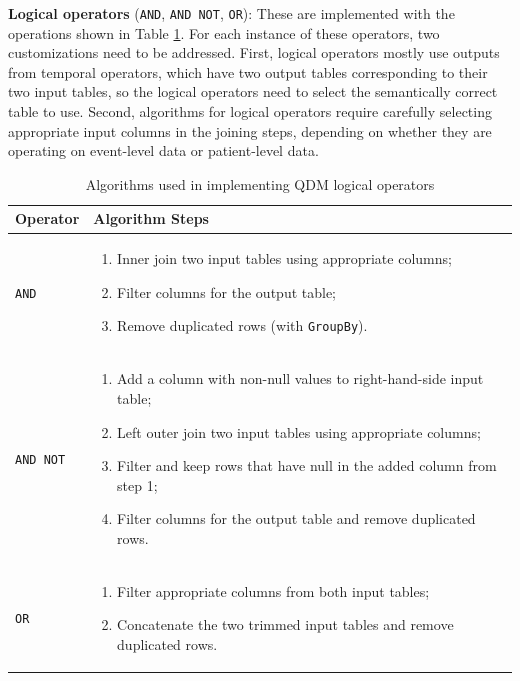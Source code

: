 \documentclass{article}
\begin{document}
\textbf{Logical operators} (\texttt{AND}, \texttt{AND NOT}, \texttt{OR}): These are implemented with the operations shown in Table \ref{tab:boolean}.  For each instance of these operators, two customizations need to be addressed.  First, logical operators mostly use outputs from temporal operators, which have two output tables corresponding to their two input tables, so the logical operators need to select the semantically correct table to use.  Second, algorithms for logical operators require carefully selecting appropriate input columns in the joining steps, depending on whether they are operating on event-level data or patient-level data.  

\vspace{5pt}
\begin{table}[h]
\begin{center}
\begin{tabular}{p{}p{}}
\toprule
Operator	&Algorithm Steps \\
\midrule
\texttt{AND}	&\begin{enumerate} 
  \item Inner join two input tables using appropriate columns;
  \item Filter columns for the output table;
  \item Remove duplicated rows (with \texttt{GroupBy}).
\end{enumerate}
\\ 
\texttt{AND NOT}	&\begin{enumerate} 
  \item Add a column with non-null values to right-hand-side input table;
  \item Left outer join two input tables using appropriate columns;
  \item Filter and keep rows that have null in the added column from step 1;
  \item Filter columns for the output table and remove duplicated rows.
\end{enumerate}
\\ 
\texttt{OR}	&\begin{enumerate} 
  \item Filter appropriate columns from both input tables;
  \item Concatenate the two trimmed input tables and remove duplicated rows.
\end{enumerate}
\\ 
\bottomrule
\end{tabular}
\caption{Algorithms used in implementing QDM logical operators} 
\label{tab:boolean}
\end{center}
\end{table}
\end{document}
